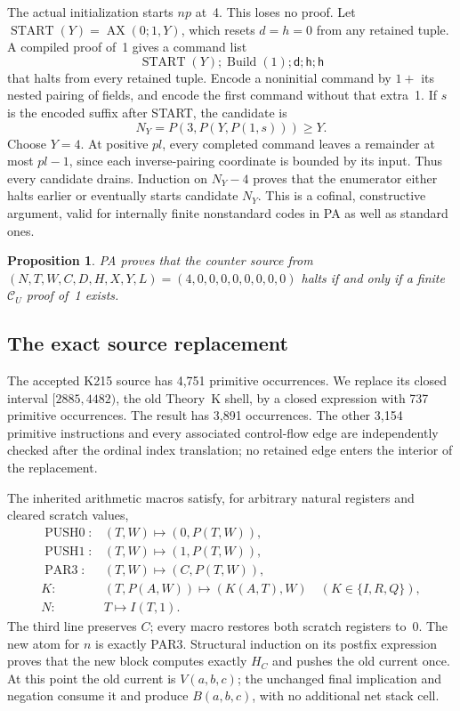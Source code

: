 \documentclass[11pt]{article}
\newcommand{\CU}{\mathcal C_U}
\newtheorem{proposition}[theorem]{Proposition}
\theoremstyle{definition}\newtheorem{definition}[theorem]{Definition}
\begin{document}
The actual initialization starts $np$ at~4. This loses no proof.
Let $\operatorname{START}(Y)=\operatorname{AX}(0;1,Y)$, which resets
$d=h=0$ from any retained tuple. A compiled proof of~1 gives a command
list
\[
 \operatorname{START}(Y);\operatorname{Build}(1);
                   \mathsf d;\mathsf h;\mathsf h
\]
that halts from every retained tuple. Encode a noninitial command by
$1+$ its nested pairing of fields, and encode the first command without
that extra~1. If $s$ is the encoded suffix after START, the candidate is
\[
 N_Y=P(3,P(Y,P(1,s)))\ge Y.
\]
Choose $Y=4$. At positive $pl$, every completed command leaves a remainder
at most $pl-1$, since each inverse-pairing coordinate is bounded by its
input. Thus every candidate drains. Induction on $N_Y-4$ proves that
the enumerator either halts earlier or eventually starts candidate $N_Y$.
This is a cofinal, constructive argument, valid for internally finite
nonstandard codes in PA as well as standard ones.

\begin{proposition}\label{prop:enum}
PA proves that the counter source from $(N,T,W,C,D,H,X,Y,L)
=(4,0,0,0,0,0,0,0,0)$ halts if and only if a finite $\CU$ proof of~1 exists.
\end{proposition}

\subsection{The exact source replacement}

The accepted K215 source has 4,751 primitive occurrences. We replace its
closed interval $[2885,4482)$, the old Theory~K shell, by a closed expression
with 737 primitive occurrences. The result has 3,891 occurrences. The
other 3,154 primitive instructions and every associated control-flow edge
are independently checked after the ordinal index translation; no retained
edge enters the interior of the replacement.

The inherited arithmetic macros satisfy, for arbitrary natural registers
and cleared scratch values,
\begin{align*}
 \operatorname{PUSH0}:&(T,W)\mapsto(0,P(T,W)),\\
 \operatorname{PUSH1}:&(T,W)\mapsto(1,P(T,W)),\\
 \operatorname{PAR3}:&(T,W)\mapsto(C,P(T,W)),\\
 K:&(T,P(A,W))\mapsto(K(A,T),W)\quad(K\in\{I,R,Q\}),\\
 N:&T\mapsto I(T,1).
\end{align*}
The third line preserves $C$; every macro restores both scratch registers
to~0. The new atom for $n$ is exactly PAR3.
Structural induction on its postfix expression proves that the new block
computes exactly $H_C$ and pushes the old current once. At this point
the old current is $V(a,b,c)$; the unchanged final implication and negation
consume it and produce $B(a,b,c)$, with no additional net stack cell.
\end{document}
